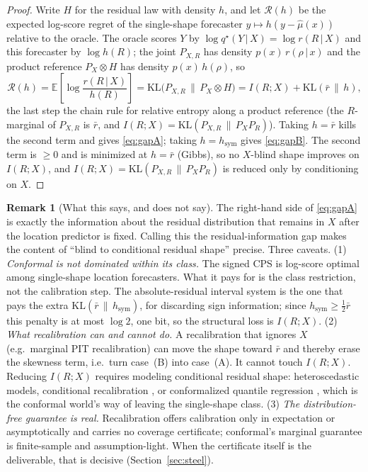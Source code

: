 \documentclass[10pt]{article} %
\theoremstyle{definition}
\newtheorem{remark}{Remark}
\newcommand{\E}{\mathbb{E}}
\newcommand{\KL}{\mathrm{KL}}
\newcommand{\given}{\,\vert\,}
\begin{document}
\begin{proof}
Write $H$ for the residual law with density $h$, and let $\mathcal{R}(h)$ be the expected log-score
regret of the single-shape forecaster $y\mapsto h(y-\hat\mu(x))$ relative to the oracle. The
oracle scores $Y$ by $\log q^\star(Y\given X)=\log r(R\given X)$ and this forecaster by
$\log h(R)$; the joint $P_{X,R}$ has density $p(x)\,r(\rho\given x)$ and the product reference
$P_X\otimes H$ has density $p(x)\,h(\rho)$, so
\begin{equation}\label{eq:master}
  \mathcal{R}(h)=\E\!\left[\log\frac{r(R\given X)}{h(R)}\right]
      =\KL\!\big(P_{X,R}\,\big\|\,P_X\otimes H\big)
      = I(R;X)+\KL(\bar r\,\|\,h),
\end{equation}
the last step the chain rule for relative entropy along a product reference (the $R$-marginal
of $P_{X,R}$ is $\bar r$, and $I(R;X)=\KL(P_{X,R}\,\|\,P_X P_R)$). Taking $h=\bar r$ kills the
second term and gives \eqref{eq:gapA}; taking $h=h_{\mathrm{sym}}$ gives \eqref{eq:gapB}. The
second term is $\ge 0$ and is minimized at $h=\bar r$ (Gibbs), so no $X$-blind shape improves
on $I(R;X)$, and $I(R;X)=\KL(P_{X,R}\,\|\,P_X P_R)$ is reduced only by conditioning on $X$.
\end{proof}

\begin{remark}[What this says, and does not say]
The right-hand side of \eqref{eq:gapA} is exactly the information about the residual
distribution that remains in $X$ after the location predictor is fixed. Calling this the
residual-information gap makes the content of ``blind to conditional residual shape'' precise. Three caveats. (1) \emph{Conformal is not dominated within its class.} The signed CPS is
log-score optimal among single-shape location forecasters. What it pays for is the class
restriction, not the calibration step. The absolute-residual interval system is the one that pays the
extra $\KL(\bar r\,\|\,h_{\mathrm{sym}})$, for discarding sign information; since
$h_{\mathrm{sym}}\ge\tfrac12\bar r$ this penalty is at most $\log 2$, one bit, so the
structural loss is $I(R;X)$. (2)
\emph{What recalibration can and cannot do.} A recalibration that ignores $X$ (e.g.\
marginal PIT recalibration) can move the shape toward $\bar r$ and thereby erase the
skewness term, i.e.\ turn case~(B) into case~(A). It cannot touch $I(R;X)$. Reducing
$I(R;X)$ requires modeling conditional residual shape: heteroscedastic models,
conditional recalibration \citep{kuleshov2018accurate}, or conformalized quantile
regression \citep{romano2019conformalized}, which is the conformal world's way of leaving
the single-shape class. (3) \emph{The distribution-free guarantee is real.} Recalibration
offers calibration only in expectation or asymptotically and carries no coverage
certificate; conformal's marginal guarantee is finite-sample and assumption-light. When
the certificate itself is the deliverable, that is decisive (Section~\ref{sec:steel}).
\end{remark}
\end{document}
